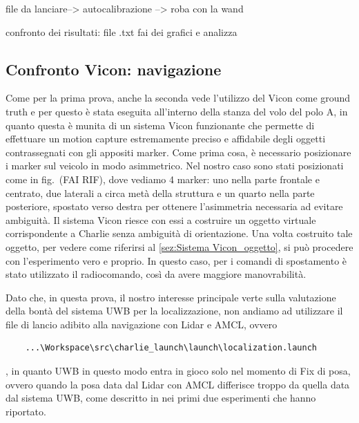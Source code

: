 file da lanciare--> autocalibrazione
				--> roba con la wand
				
confronto dei risultati: file .txt
fai dei grafici e analizza


\subsection{Confronto Vicon: navigazione}

Come per la prima prova, anche la seconda vede l'utilizzo del Vicon come ground truth e per questo è stata eseguita all'interno della stanza del volo del polo A, in quanto questa è munita di un sistema Vicon funzionante che permette di effettuare un motion capture estremamente preciso e affidabile degli oggetti contrassegnati con gli appositi marker. Come prima cosa, è necessario posizionare i marker sul veicolo in modo asimmetrico. Nel nostro caso sono stati posizionati come in fig.~(FAI RIF), dove vediamo 4 marker: uno nella parte frontale e centrato, due laterali a circa metà della struttura e un quarto nella parte posteriore, spostato verso destra per ottenere l'asimmetria necessaria ad evitare ambiguità. Il sistema Vicon riesce con essi a costruire un oggetto virtuale corrispondente a Charlie senza ambiguità di orientazione. Una volta costruito tale oggetto, per vedere come riferirsi al \ref{sez:Sistema Vicon_oggetto}, si può procedere con l'esperimento vero e proprio. In questo caso, per i comandi di spostamento è stato utilizzato il radiocomando, così da avere maggiore manovrabilità.

Dato che, in questa prova, il nostro interesse principale verte sulla valutazione della bontà del sistema UWB per la localizzazione, non andiamo ad utilizzare il file di lancio adibito alla navigazione con Lidar e AMCL, ovvero 
\begin{verbatim}
	...\Workspace\src\charlie_launch\launch\localization.launch
\end{verbatim}
 , in quanto UWB in questo modo entra in gioco solo nel momento di Fix di posa, ovvero quando la posa data dal Lidar con AMCL differisce troppo da quella data dal sistema UWB, come descritto in \cite{ptvlocalizzazione} nei primi due esperimenti che hanno riportato.
 
